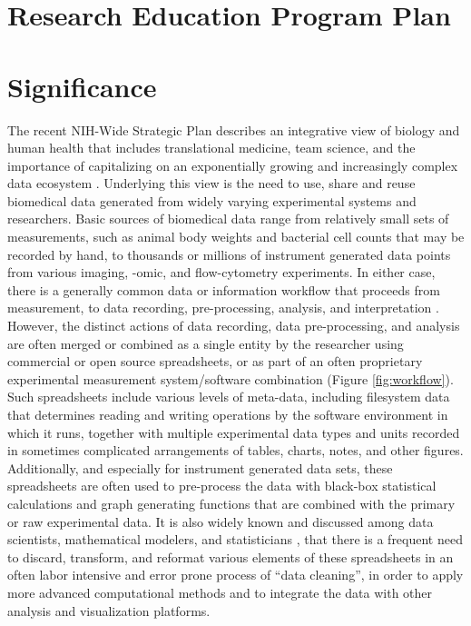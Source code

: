 \documentclass[pdftex,english,11pt,parskip=half]{scrartcl}
\begin{document}
\def\bf{\normalfont\bfseries}
\pagestyle{empty}

\section*{Research Education Program Plan}

\section{Significance}
\vspace{-0.1in}

The recent NIH-Wide Strategic Plan \cite{nih2016strategic} describes an
integrative view of biology and human health that includes translational
medicine, team science, and the importance of capitalizing on an exponentially 
growing and increasingly complex data ecosystem \cite{nih2018data}.  Underlying 
this view is the need to use, share and reuse biomedical data generated from widely 
varying experimental systems and researchers. Basic sources of biomedical data range 
from relatively small sets of measurements, such as animal body weights and bacterial 
cell counts that may be recorded by hand, to thousands or millions of instrument generated 
data points from various imaging, -omic, and flow-cytometry experiments. In either case, 
there is a generally common data or information workflow that proceeds 
from measurement, to data recording, pre-processing, analysis, and interpretation 
\cite{}.  However, the distinct actions of data recording, data pre-processing, and analysis 
are often merged or combined as a single entity by the researcher using commercial or open 
source spreadsheets, or as part of an often proprietary experimental measurement 
system/software combination (Figure \ref{fig:workflow}).  Such spreadsheets include various 
levels of meta-data, including filesystem data that determines 
reading and writing operations by the software environment in which it runs, together with multiple 
experimental data types and units recorded in sometimes complicated arrangements of tables, 
charts, notes, and other figures.  Additionally, and especially for instrument generated data sets, 
these spreadsheets are often used to pre-process the data with black-box statistical calculations 
and graph generating 
functions that are combined with the primary or raw experimental data.  It is also widely 
known and discussed among data scientists, mathematical modelers, and statisticians 
\cite{broman2018data, krishnan2016towards}, that there is a frequent need to discard, 
transform, and reformat various elements of these spreadsheets in an often labor intensive and error 
prone process of ``data cleaning'', in order to apply more advanced computational methods 
and to integrate the data with other analysis and visualization platforms.
\end{document}
